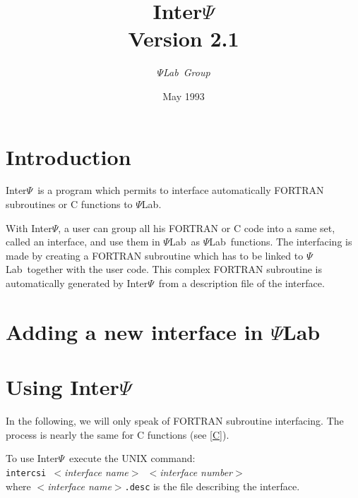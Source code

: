\textheight=660pt \textwidth=470pt
\topmargin=-27pt
\oddsidemargin=0pt \evensidemargin=0pt \marginparwidth=60pt

\newcommand{\version}{Version 2.1}
\newcommand{\ISCI}{Inter$\Psi$}
\newcommand{\SCI}{$\Psi$Lab}
\newcommand{\T}[1]{{\tt #1}}
\newcommand{\M}[1]{$<${\em #1}$>$}
\newcommand{\ie}{\mbox{i.e.}}

\title{{\Huge\bf\ISCI}\\{\normalsize \version}}
\author{\Large\sl\SCI\ Group}
\date{May 1993}



\pagestyle{myheadings}
\markright{\ISCI\ \version}

\maketitle

\section{Introduction}
\ISCI\ is a program which permits to interface automatically FORTRAN 
subroutines or C functions to \SCI.

With \ISCI, a user can group all his FORTRAN or C code into a same set,
called an interface, and use them in \SCI\ as \SCI\ functions. The interfacing
is made by creating a FORTRAN subroutine which has to be linked to \SCI\ together
with the user code. This complex FORTRAN subroutine is automatically generated
by \ISCI\ from a description file of the interface.

\section{Adding a new interface in \SCI}

\section{Using \ISCI}
In the following, we will only speak of FORTRAN subroutine interfacing. The
process is nearly the same for C functions (see \ref{C}).

\smallskip

To use \ISCI\ execute the UNIX command:\\
\T{intercsi }\M{interface name}\T{\ }\M{interface number}\\
where \M{interface name}\T{.desc} is the file describing the interface.

